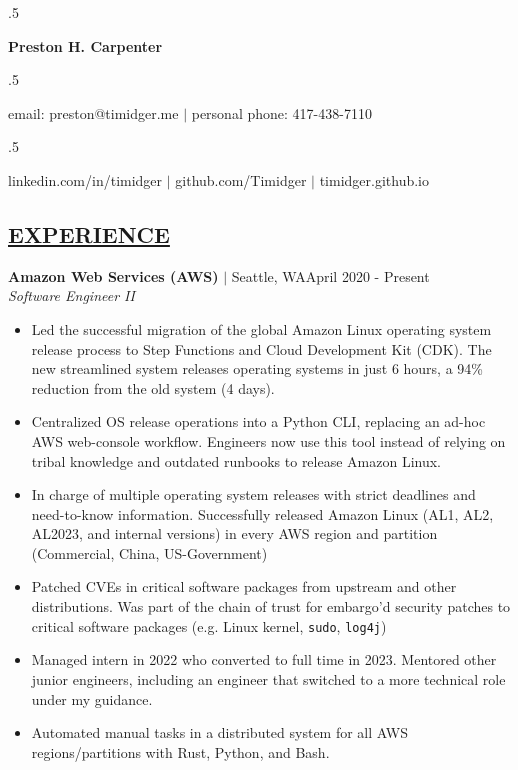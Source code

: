 \documentclass[overlapped,line]{res}
\begin{document}
\moveleft.5\hoffset\centerline{\huge\bf Preston H. Carpenter}
\vspace{.2em}

\moveleft.5\hoffset\centerline{email: preston@timidger.me $|$ personal phone: 417-438-7110}
\moveleft.5\hoffset\centerline{linkedin.com/in/timidger $|$ github.com/Timidger $|$ timidger.github.io }
\vspace{1em}

\begin{resume}

\section{\underline{EXPERIENCE}}

\textbf{Amazon Web Services (AWS)} $|$ Seattle, WA\hfill April 2020 - Present\\
{\sl Software Engineer II}
\begin{itemize} \itemsep -2pt
	\item Led the successful migration of the global Amazon Linux
		operating system release process to Step Functions and Cloud Development Kit
		(CDK). The new streamlined system releases operating systems in
		just 6 hours, a 94\% reduction from the old system (4 days).
	\item Centralized OS release operations into a
		Python CLI, replacing an ad-hoc AWS web-console workflow.
		Engineers now use this tool instead of relying on tribal knowledge
		and outdated runbooks to release Amazon Linux.
	\item In charge of multiple operating system releases with strict
		deadlines and need-to-know information. Successfully released
		Amazon Linux (AL1, AL2, AL2023, and internal
		versions) in every AWS region and partition (Commercial, China, US-Government)
	\item Patched CVEs in critical software packages from upstream and other
		distributions. Was part of the chain of trust for embargo'd
		security patches to critical software packages (e.g.
		Linux kernel, \texttt{sudo}, \texttt{log4j})
	\item Managed intern in 2022 who converted to full time in 2023.
		Mentored other junior engineers, including an engineer that
		switched to a more technical role under my guidance.
	\item Automated manual tasks in a distributed
		system for all AWS regions/partitions with
		Rust, Python, and Bash.
\end{itemize}


\end{resume}
\end{document}
